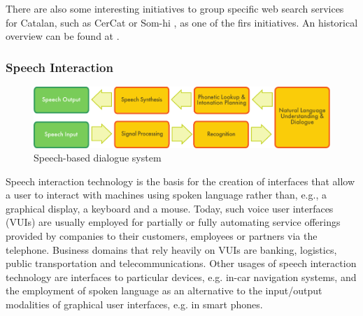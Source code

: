 \begin{multicols}{2}
There are also some interesting initiatives to group specific web search services for Catalan, such as CerCat or Som-hi \cite{CAT-cercadors}, as one of the firs initiatives. An historical overview can be found at \cite{CAT-Resum-sobre-cercadors}.

\subsubsection{Speech Interaction}

\begin{figure}[htb]
  \center
  \includegraphics[width=\textwidth]{../_media/english/simple_speech-based_dialogue_architecture}
  \caption{Speech-based dialogue system}
  \label{fig:dialoguearch_en}
\end{figure}

Speech interaction technology is the basis for the creation of interfaces that allow a user to interact with machines using spoken language rather than, e.g., a graphical display, a keyboard and a mouse. Today, such voice user interfaces (VUIs) are usually employed for partially or fully automating service offerings provided by companies to their customers, employees or partners via the telephone. Business domains that rely heavily on VUIs are banking, logistics, public transportation and telecommunications. Other usages of speech interaction technology are interfaces to particular devices, e.g. in-car navigation systems, and the employment of spoken language as an alternative to the input/output modalities of graphical user interfaces, e.g. in smart phones.


\end{multicols}
